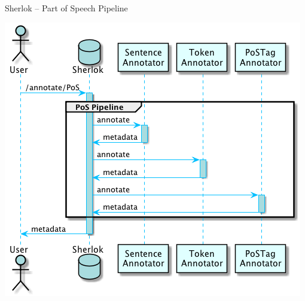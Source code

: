 \documentclass[10pt, compress, xcolor={usenames,dvipsnames}]{beamer}
\begin{document}
\begin{frame}[fragile]{Sherlok -- Part of Speech Pipeline}

  \begin{center}
    \vspace{-1em}
    \includegraphics[width=\textwidth, height=0.8\textheight, keepaspectratio]
      {../report/res/sherlok_basic_rest_call.png}
  \end{center}

\end{frame}
\end{document}
